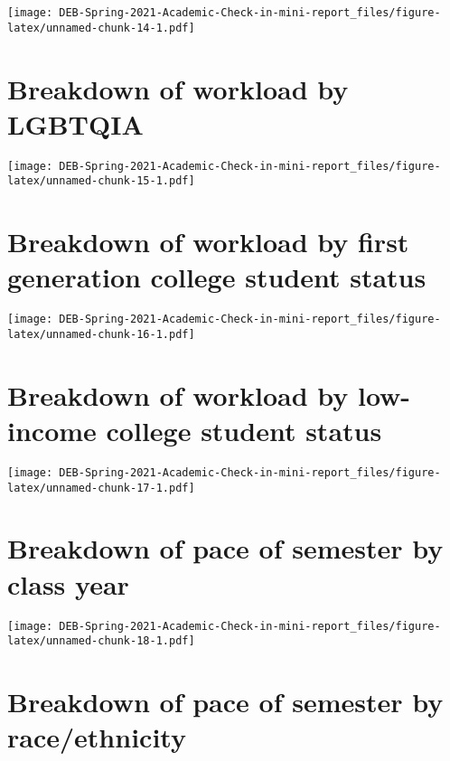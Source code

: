 \documentclass[
]{article}
\begin{document}
\texttt{[image: DEB-Spring-2021-Academic-Check-in-mini-report\_files/figure-latex/unnamed-chunk-14-1.pdf]}

\hypertarget{breakdown-of-workload-by-lgbtqia}{%
\section{Breakdown of workload by
LGBTQIA}\label{breakdown-of-workload-by-lgbtqia}}

\texttt{[image: DEB-Spring-2021-Academic-Check-in-mini-report\_files/figure-latex/unnamed-chunk-15-1.pdf]}

\hypertarget{breakdown-of-workload-by-first-generation-college-student-status}{%
\section{Breakdown of workload by first generation college student
status}\label{breakdown-of-workload-by-first-generation-college-student-status}}

\texttt{[image: DEB-Spring-2021-Academic-Check-in-mini-report\_files/figure-latex/unnamed-chunk-16-1.pdf]}

\hypertarget{breakdown-of-workload-by-low-income-college-student-status}{%
\section{Breakdown of workload by low-income college student
status}\label{breakdown-of-workload-by-low-income-college-student-status}}

\texttt{[image: DEB-Spring-2021-Academic-Check-in-mini-report\_files/figure-latex/unnamed-chunk-17-1.pdf]}

\hypertarget{breakdown-of-pace-of-semester-by-class-year}{%
\section{Breakdown of pace of semester by class
year}\label{breakdown-of-pace-of-semester-by-class-year}}

\texttt{[image: DEB-Spring-2021-Academic-Check-in-mini-report\_files/figure-latex/unnamed-chunk-18-1.pdf]}

\hypertarget{breakdown-of-pace-of-semester-by-raceethnicity}{%
\section{Breakdown of pace of semester by
race/ethnicity}\label{breakdown-of-pace-of-semester-by-raceethnicity}}
\end{document}
